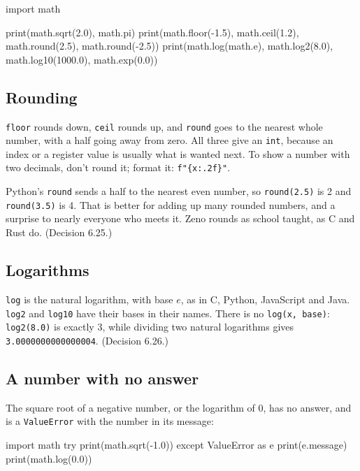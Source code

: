 \begin{zeno}
import math

print(math.sqrt(2.0), math.pi)
print(math.floor(-1.5), math.ceil(1.2), math.round(2.5), math.round(-2.5))
print(math.log(math.e), math.log2(8.0), math.log10(1000.0), math.exp(0.0))
\end{zeno}

\subsection{Rounding}

\verb|floor| rounds down, \verb|ceil| rounds up, and \verb|round| goes
to the nearest whole number, with a half going away from zero. All
three give an \verb|int|, because an index or a register value is
usually what is wanted next. To show a number with two decimals,
don't round it; format it: \verb|f"{x:.2f}"|.

\begin{why}
Python's \verb|round| sends a half to the nearest even number, so
\verb|round(2.5)| is 2 and \verb|round(3.5)| is 4. That is better for
adding up many rounded numbers, and a surprise to nearly everyone who
meets it. Zeno rounds as school taught, as C and Rust do.
(Decision 6.25.)
\end{why}

\subsection{Logarithms}

\verb|log| is the natural logarithm, with base $e$, as in C, Python,
JavaScript and Java. \verb|log2| and \verb|log10| have their bases in
their names. There is no \verb|log(x, base)|: \verb|log2(8.0)| is
exactly 3, while dividing two natural logarithms gives
\verb|3.0000000000000004|. (Decision 6.26.)

\subsection{A number with no answer}

The square root of a negative number, or the logarithm of 0, has no
answer, and is a \verb|ValueError| with the number in its message:

\begin{zeno}[fails=yes]
import math
try {
    print(math.sqrt(-1.0))
} except ValueError as e {
    print(e.message)
}
print(math.log(0.0))
\end{zeno}

